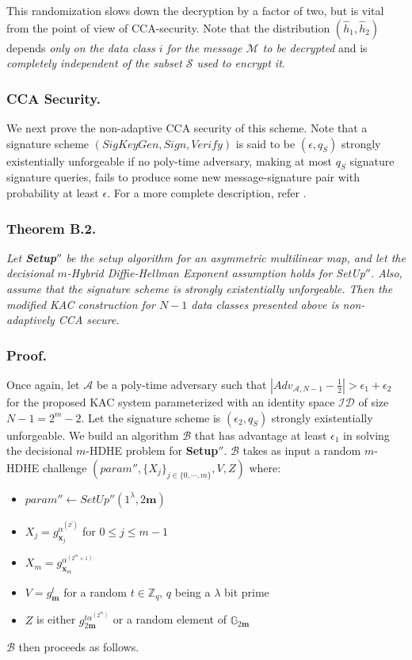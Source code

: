 \noindent This randomization slows down the decryption by a factor of two, but is vital from the point of view of CCA-security. Note that the distribution $(\hat{h}_1,\hat{h}_2)$ depends \emph{only on the data class $i$ for the message $\mathcal{M}$ to be decrypted} and is \emph{completely independent of the subset $\mathcal{S}$ used to encrypt it}. 

\subsubsection{CCA Security.} We next prove the non-adaptive CCA security of this scheme. Note that a signature scheme $(SigKeyGen,Sign,Verify)$ is said to be $(\epsilon,q_S)$ strongly existentially unforgeable if no poly-time adversary, making at most $q_{S}$ signature signature queries, fails to produce some new message-signature pair with probability at least $\epsilon$. For a more complete description, refer \cite{canetti2004chosen}.

\subsubsection{Theorem B.2.} \textit{Let \textbf{Setup}$''$ be the setup algorithm for an asymmetric multilinear map, and let the decisional $m$-Hybrid Diffie-Hellman Exponent assumption holds for {SetUp}$''$. Also, assume that the signature scheme is strongly existentially unforgeable. Then the modified KAC construction for $N-1$ data classes presented above is non-adaptively CCA secure.}

\subsubsection{Proof.} Once again, let $\mathcal{A}$ be a poly-time adversary such that $|Adv_{\mathcal{A},N-1}-\frac{1}{2}| > \epsilon_1+\epsilon_2$ for the proposed KAC system parameterized with an identity space $\mathcal{ID}$ of size $N-1=2^m-2$. Let the signature scheme is $(\epsilon_2,q_S)$ strongly existentially unforgeable. We build an algorithm $\mathcal{B}$ that has advantage at least $\epsilon_1$ in solving the decisional $m$-HDHE problem for \textbf{Setup}$''$. $\mathcal{B}$ takes as input a random $m$-HDHE challenge $(param'',\{X_j\}_{j\in\{0,\cdots,m\}},V,Z)$ where:
\begin{itemize}
 \item $param''\leftarrow SetUp''(1^{\lambda},2\mathbf{m})$ 
 \item $X_j=g^{\alpha^{(2^j)}}_{\mathbf{x}_j}$ for $0\leq j \leq m-1$
 \item $X_m=g^{\alpha^{(2^m+1)}}_{\mathbf{x}_m}$
 \item $V=g^{t}_{\mathbf{m}}$ for a random $t\in\mathbb{Z}_q$, $q$ being a $\lambda$ bit prime
 \item $Z$ is either $g^{t\alpha^{(2^m)}}_{2\mathbf{m}}$ or a random element of $\mathbb{G}_{2\mathbf{m}}$
\end{itemize}
\noindent $\mathcal{B}$ then proceeds as follows.\\

